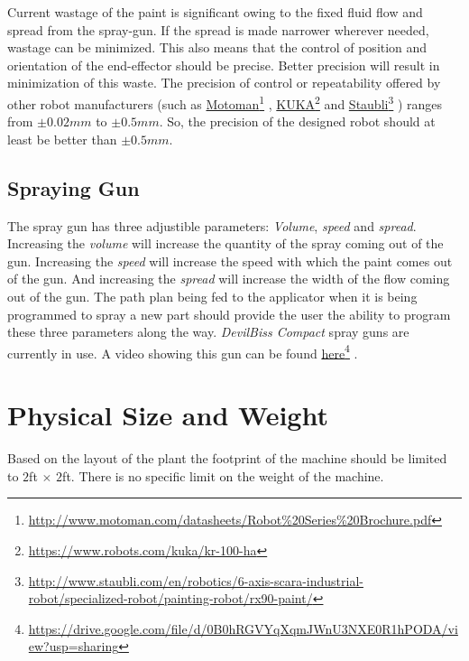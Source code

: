 \documentclass[a4paper,10pt]{article}
\newcommand\fnurl[2]{%
  \href{#1}{#2}\footnote{\url{#1}}%
}
\begin{document}
Current wastage of the paint is significant owing to the fixed fluid flow and spread from the spray-gun. If 
the spread is made narrower wherever needed, wastage can be minimized. This also means that the control of position and orientation
of the end-effector should be precise. Better precision will result in minimization of this waste. The precision of control or
repeatability offered by other robot manufacturers (such as \fnurl{http://www.motoman.com/datasheets/Robot\%20Series\%20Brochure.pdf}{Motoman}, 
\fnurl{https://www.robots.com/kuka/kr-100-ha}{KUKA} and \fnurl{http://www.staubli.com/en/robotics/6-axis-scara-industrial-robot/specialized-robot/painting-robot/rx90-paint/}{Staubli}) 
ranges from $\pm 0.02mm$ to $\pm 0.5mm$. So, the precision of the designed robot should at least be better than $\pm 0.5mm$.

\subsection{Spraying Gun}
The spray gun has three adjustible parameters: \emph{Volume}, \emph{speed} and \emph{spread}. Increasing the \emph{volume}
 will increase the quantity of the spray coming out of the gun. Increasing the \emph{speed} will increase the
 speed with which the paint comes out of the gun. And increasing the \emph{spread} will increase the width of
 the flow coming out of the gun. The path plan being fed to the applicator when it is being programmed
 to spray a new part should provide the user the ability to program these three parameters along 
 the way. \emph{DevilBiss Compact} spray guns are currently in use. A video showing this gun can be found 
 \fnurl{https://drive.google.com/file/d/0B0hRGVYqXqmJWnU3NXE0R1hPODA/view?usp=sharing}{here}.

\section{Physical Size and Weight}
Based on the layout of the plant the footprint of the machine should be limited to $2$ft $\times$ $2$ft. There is no specific limit on 
the weight of the machine. 
\end{document}
